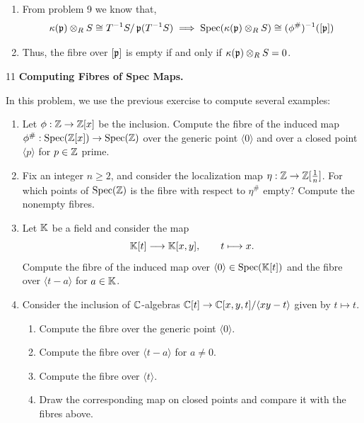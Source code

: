 \documentclass[Notebook.tex]{subfiles}
\begin{document}
\begin{solution}
\begin{enumerate}
        \item From problem 9 we know that, 
        \[\kappa(\operatorname{\mathfrak{p}}) \otimes_R S \cong T^{-1}S / \operatorname{\mathfrak{p}}(T^{-1}S) \implies \operatorname{Spec}(\kappa(\operatorname{\mathfrak{p}}) \otimes_R S) \cong (\phi^{\#})^{-1}([\operatorname{\mathfrak{p}}])\]

        \item Thus, the fibre over $[\operatorname{\mathfrak{p}}]$ is empty if and only if $\kappa(\operatorname{\mathfrak{p}})\otimes_R S=0$.
    \end{enumerate}
\end{solution}

\newpage 

\begin{problem}{11}
    \textbf{Computing Fibres of Spec Maps.} 
    
    In this problem, we use the previous exercise to compute several examples:
    \begin{enumerate}
        \item Let $\phi:\mathbb Z\to \mathbb Z[x]$ be the inclusion. Compute the fibre of the induced map $\phi^{\#}:\operatorname{Spec}(\mathbb Z[x]) \to \operatorname{Spec}(\mathbb Z)$ over the generic point $\langle 0\rangle$ and over a closed point $\langle p\rangle$ for $p \in \mathbb Z$ prime. 
        \item Fix an integer $n\geq 2$, and consider the localization map $\eta: \mathbb Z\to \mathbb Z[\frac{1}{n}]$. For which points of $\operatorname{Spec}(\mathbb Z)$ is the fibre with respect to $\eta^{\#}$ empty? Compute the nonempty fibres.
        \item Let $\mathbb K$ be a field and consider the map
        \[
        \mathbb K[t]\longrightarrow \mathbb K[x,y],
        \qquad
         t\longmapsto x.
        \]
        Compute the fibre of the induced map over $\langle 0\rangle\in \operatorname{Spec}(\mathbb K[t])$ and the fibre over $\langle t-a\rangle$ for $a\in \mathbb K$.
        \item Consider the inclusion of $\mathbb C$-algebras $\mathbb C[t] \to \mathbb C[x,y,t]/\langle xy-t\rangle$ given by $t \mapsto t$.
        \begin{enumerate}
            \item Compute the fibre over the generic point $\langle 0\rangle$.
            \item Compute the fibre over $\langle t-a\rangle$ for $a\neq 0$.
            \item Compute the fibre over $\langle t\rangle$.
            \item Draw the corresponding map on closed points and compare it with the fibres above.
        \end{enumerate}
    \end{enumerate}
\end{problem}
\end{document}

